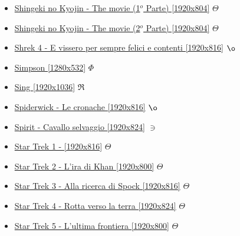 \begin{itemize}
			\item \href{https://mega.nz/#!EOBAVKoZ!IfaxoR2beD2jp7UimRS0nrL7hEqAvLV2SkB3xtJnSZI} {Shingeki no Kyojin - The movie (1$ ^{o} $ Parte) [1920x804]}  $\varTheta$ \\
			\item \href{https://mega.nz/#F!QXAE0Jqa!Kw9eF2q5oGo1Kj34yjZ5KA} {Shingeki no Kyojin - The movie (2$ ^{o} $ Parte) [1920x804]}  $\varTheta$ \\
			\item \href{https://mega.nz/#!E950naqT!vvvIvvil7XpHnfS5TBjFSvA8XsZDnovzEsjQ2CE5tBk} {Shrek 4 - E vissero per sempre felici e contenti [1920x816]}  $\o$ \\
			\item \href{https://mega.nz/#!BOZwVBRT!0-cIBIwoVFjdO8SOGFzpM1Mud6BVs9EtiejlGUcJE8U} {Simpson [1280x532]}  $\Phi$ \\
			\item \href{https://mega.nz/#!PK5iVSJR!QPYN1oKaF1hBMaBwbCFnm17nh235T_u80C_x9b_ya6Y} {Sing [1920x1036]}  $\Re$ \\
			\item \href{https://mega.nz/#!whhWAJSQ!REmFWqaDjsmEDc0yBpgFFtLFALzquKd_8V0omd71oUs} {Spiderwick - Le cronache [1920x816]}  $\o$ \\
			\item \href{https://mega.nz/#!HaR2AKhK!F1kAzJCMA1rdlVMl7eONnefoIDXasoruCFHNqTCD3Rs} {Spirit - Cavallo selvaggio [1920x824]}  $\ni$ \\
			\item \href{https://mega.nz/#!PsogibbT!6KKAIDfWpdWABGskDNjRUEIlRPAsgiOp70dT2747Ihs} {Star Trek 1 -  [1920x816]}  $\Theta$ \\
			\item \href{https://mega.nz/#!ykhTjKIR!WQbpfATsZzDIiueC26_JTD7Rr4jmspgiGHXebLus3oY} {Star Trek 2 - L'ira di Khan  [1920x800]}  $\Theta$ \\
			\item \href{https://mega.nz/#!7x4hSBxB!ZfVacBHD_KWqYCC-fTV1j2qmOfwdsx5Z4g8C6wZRU30} {Star Trek 3 - Alla ricerca di Spock [1920x816]}  $\Theta$ \\
			\item \href{https://mega.nz/#!DgISUBRK!lEyaD1gvqW_XMgI3wPucpQ-3czRNsAGePXSiju8kac0} {Star Trek 4 - Rotta verso la terra [1920x824]}  $\Theta$ \\
			\item \href{https://mega.nz/#!75ZR3BCT!QOz-D4osITIUdJVTQtSpNz_8pPa0OAh17ii61wD9Vyo} {Star Trek 5 - L'ultima frontiera [1920x800]}  $\Theta$ \\

\end{itemize}
